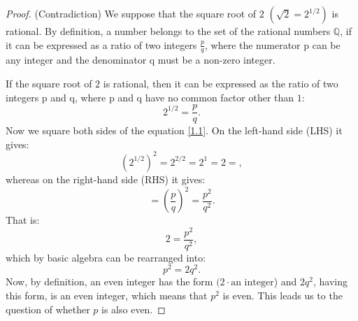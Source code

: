 \documentclass[11pt]{amsart}
\theoremstyle{definition}
\begin{document}
\begin{proof}\label{1.0}
    (Contradiction) We suppose that the square root of \(2\) \((\sqrt{2} = 2^{1/2})\) is rational.
    By definition, a number belongs to the set of the rational numbers \(\mathbb{Q}\), if it can be expressed as a ratio of two integers  \(\frac{p}{q}\), where the numerator p can be any integer and the denominator q must be a non-zero integer.

    If the square root of \(2\) is rational, then it can be expressed as the ratio of two integers p and q, where p and q have no common factor other than \(1\):
    \begin{equation}\label{1.1}
        2^{1/2} = \frac{p}{q}.
    \end{equation}
    Now we square both sides of the equation \ref{1.1}. On the left-hand side (LHS) it gives:
    \begin{equation}\label{1.2}
        \left(2^{1/2}\right)^{2} = 2^{2/2} = 2^{1} = 2 = ,
    \end{equation}
    whereas on the right-hand side (RHS) it gives:
    \begin{equation}\label{1.3}
        = \left(\frac{p}{q}\right)^{2} = \frac{p^2}{q^2}.
    \end{equation}
    That is:
    \begin{equation}\label{1.4}
        2 = \frac{p^2}{q^2},
    \end{equation}
    which by basic algebra can be rearranged into:
    \begin{equation}\label{1.5}
        p^{2} = 2q^{2}.
    \end{equation}
    Now, by definition, an even integer has the form \((2 \cdot \text{an integer}\))
    and \(2q^{2}\), having this form, is an even integer, which means that \(p^{2}\) is even. This leads us to the question of whether \(p\) is also even.


\end{proof}
\end{document}

